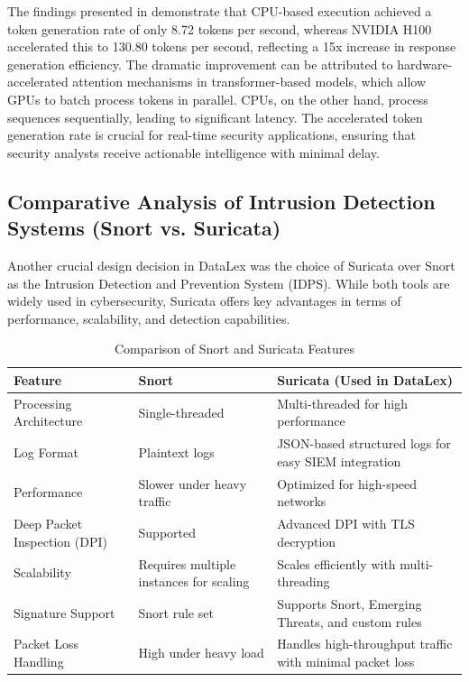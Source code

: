 The findings presented in  demonstrate that CPU-based execution achieved a token generation rate of only 8.72 tokens per second, whereas NVIDIA H100 accelerated this to 130.80 tokens per second, reflecting a 15x increase in response generation efficiency. The dramatic improvement can be attributed to hardware-accelerated attention mechanisms in transformer-based models, which allow GPUs to batch process tokens in parallel. CPUs, on the other hand, process sequences sequentially, leading to significant latency. The accelerated token generation rate is crucial for real-time security applications, ensuring that security analysts receive actionable intelligence with minimal delay.

\subsection{Comparative Analysis of Intrusion Detection Systems (Snort vs. Suricata)}
\label{subsec_comparative_snort_suricata}

Another crucial design decision in DataLex was the choice of Suricata over Snort as the Intrusion Detection and Prevention System (IDPS). While both tools are widely used in cybersecurity, Suricata offers key advantages in terms of performance, scalability, and detection capabilities.

\begin{table}[h!]
\centering
\begin{tabular}{p{2.6cm}p{3.7cm}p{4.5cm}}
\hline
\textbf{Feature} & \textbf{Snort} & \textbf{Suricata (Used in DataLex)} \\
\hline
Processing Architecture & Single-threaded & Multi-threaded for high performance \\
Log Format & Plaintext logs & JSON-based structured logs for easy SIEM integration \\
Performance & Slower under heavy traffic & Optimized for high-speed networks \\
Deep Packet Inspection (DPI) & Supported & Advanced DPI with TLS decryption \\
Scalability & Requires multiple instances for scaling & Scales efficiently with multi-threading \\
Signature Support & Snort rule set & Supports Snort, Emerging Threats, and custom rules \\
Packet Loss Handling & High under heavy load & Handles high-throughput traffic with minimal packet loss \\
\hline
\end{tabular}
\caption{Comparison of Snort and Suricata Features}
\label{tab:snort-suricata-comparison}
\end{table}

